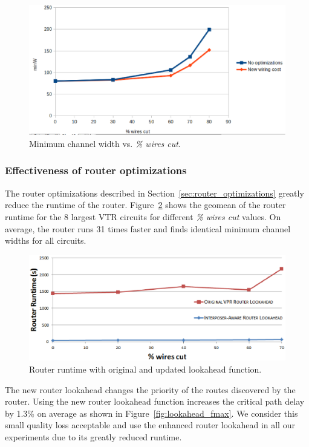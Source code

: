\documentclass{sig-alternate-2013}
\begin{document}
\begin{figure}[!htbp]
\centering
\includegraphics[width=\linewidth]{comparison_minW.eps}
\caption{Minimum channel width vs. \textit{\% wires cut}.}
\label{fig:comparison_minW}
\end{figure}

\subsubsection{Effectiveness of router optimizations}
\label{sec:effectiveness_of_router_enhancements}
The router optimizations described in Section~\ref{sec:router_optimizations} greatly reduce the runtime of the router. Figure~\ref{fig:lookahead_runtime} shows the geomean of the router runtime for the 8 largest VTR circuits for different \textit{\% wires cut} values. On average, the router runs 31 times faster and finds identical minimum channel widths for all circuits.

\begin{figure}[!hb]
\centering
\includegraphics[width=\linewidth]{router_opt.eps}
\caption{Router runtime with original and updated lookahead function.}
\label{fig:lookahead_runtime}
\end{figure}

The new router lookahead changes the priority of the routes discovered by the router. Using the new router lookahead function increases the critical path delay by 1.3\% on average as shown in Figure~\ref{fig:lookahead_fmax}. We consider this small quality loss acceptable and use the enhanced router lookahead in all our experiments due to its greatly reduced runtime.
\end{document}
